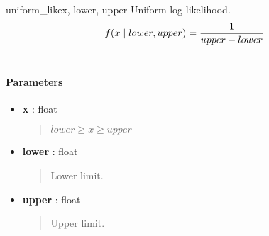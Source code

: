 \hypertarget{pymc.distributions.uniform_like}{}\begin{funcdesc}{uniform\_like}{x, lower, upper}
Uniform log-likelihood.
\begin{gather}
\begin{split}f(x \mid lower, upper) = \frac{1}{upper-lower}\end{split}\notag\\\begin{split}\end{split}\notag
\end{gather}\paragraph{Parameters}\begin{itemize}

\item[] \textbf{x} : float
\begin{quote}

$lower \geq x \geq upper$
\end{quote}

\item[] \textbf{lower} : float
\begin{quote}

Lower limit.
\end{quote}

\item[] \textbf{upper} : float
\begin{quote}

Upper limit.
\end{quote}
\end{itemize}
\end{funcdesc}

